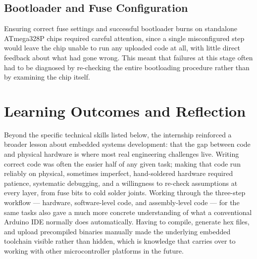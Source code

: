 \documentclass[12pt,a4paper]{report}
\begin{document}
\section{Bootloader and Fuse Configuration}
\label{sec:fuse}
Ensuring correct fuse settings and successful bootloader burns on standalone ATmega328P chips required careful attention, since a single misconfigured step would leave the chip unable to run any uploaded code at all, with little direct feedback about what had gone wrong. This meant that failures at this stage often had to be diagnosed by re-checking the entire bootloading procedure rather than by examining the chip itself.
\chapter{Learning Outcomes and Reflection}
\label{ch:outcomes}
Beyond the specific technical skills listed below, the internship reinforced a broader lesson about embedded systems development: that the gap between code and physical hardware is where most real engineering challenges live. Writing correct code was often the easier half of any given task; making that code run reliably on physical, sometimes imperfect, hand-soldered hardware required patience, systematic debugging, and a willingness to re-check assumptions at every layer, from fuse bits to cold solder joints.
Working through the three-step workflow --- hardware, software-level code, and assembly-level code --- for the same tasks also gave a much more concrete understanding of what a conventional Arduino IDE normally does automatically. Having to compile, generate hex files, and upload precompiled binaries manually made the underlying embedded toolchain visible rather than hidden, which is knowledge that carries over to working with other microcontroller platforms in the future.
\end{document}
